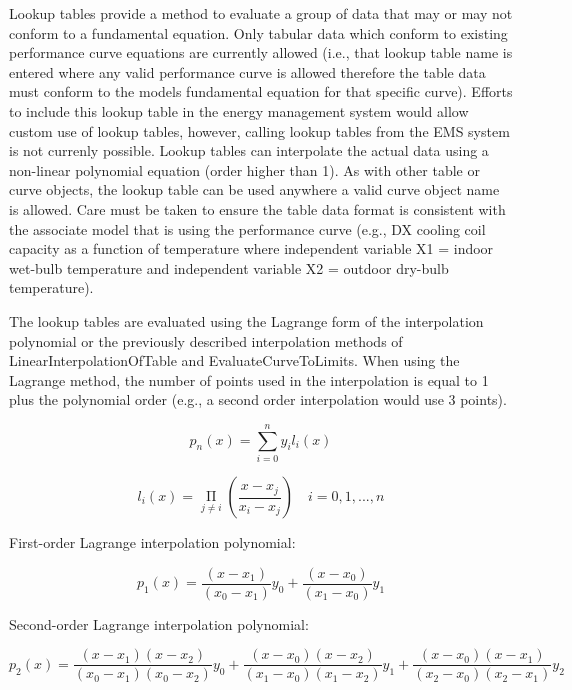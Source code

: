 Lookup tables provide a method to evaluate a group of data that may or may not conform to a fundamental equation. Only tabular data which conform to existing performance curve equations are currently allowed (i.e., that lookup table name is entered where any valid performance curve is allowed therefore the table data must conform to the models fundamental equation for that specific curve). Efforts to include this lookup table in the energy management system would allow custom use of lookup tables, however, calling lookup tables from the EMS system is not currenly possible. Lookup tables can interpolate the actual data using a non-linear polynomial equation (order higher than 1). As with other table or curve objects, the lookup table can be used anywhere a valid curve object name is allowed. Care must be taken to ensure the table data format is consistent with the associate model that is using the performance curve (e.g., DX cooling coil capacity as a function of temperature where independent variable X1 = indoor wet-bulb temperature and independent variable X2 = outdoor dry-bulb temperature).

The lookup tables are evaluated using the Lagrange form of the interpolation polynomial or the previously described interpolation methods of LinearInterpolationOfTable and EvaluateCurveToLimits. When using the Lagrange method, the number of points used in the interpolation is equal to 1 plus the polynomial order (e.g., a second order interpolation would use 3 points).

\begin{equation}
{p_n}\left( x \right) = \sum\limits_{i = 0}^n {{y_i}{l_i}\left( x \right)}
\end{equation}

\begin{equation}
{l_i}\left( x \right) = \mathop \Pi \limits_{j \ne i} \left( {\frac{{x - {x_j}}}{{{x_i} - {x_j}}}} \right)\,\,\,\,\,\,i = 0,1,...,n
\end{equation}

First-order Lagrange interpolation polynomial:

\begin{equation}
{p_1}\left( x \right) = \frac{{\left( {x - {x_1}} \right)}}{{\left( {{x_0} - {x_1}} \right)}}{y_0} + \frac{{\left( {x - {x_0}} \right)}}{{\left( {{x_1} - {x_0}} \right)}}{y_1}
\end{equation}

Second-order Lagrange interpolation polynomial:

\begin{equation}
{p_2}\left( x \right) = \frac{{\left( {x - {x_1}} \right)\left( {x - {x_2}} \right)}}{{\left( {{x_0} - {x_1}} \right)\left( {{x_0} - {x_2}} \right)}}{y_0} + \frac{{\left( {x - {x_0}} \right)\left( {x - {x_2}} \right)}}{{\left( {{x_1} - {x_0}} \right)\left( {{x_1} - {x_2}} \right)}}{y_1} + \frac{{\left( {x - {x_0}} \right)\left( {x - {x_1}} \right)}}{{\left( {{x_2} - {x_0}} \right)\left( {{x_2} - {x_1}} \right)}}{y_2}
\end{equation}


